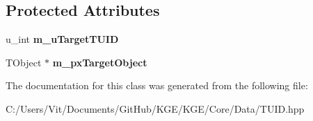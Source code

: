 \subsection*{Protected Attributes}
\begin{DoxyCompactItemize}
\item 
\hypertarget{class_k_g_e_1_1_t_u_i_d_1_1_cached_reference_a4497f5facd874ed1ff1f9c115fc605df}{u\-\_\-int {\bfseries m\-\_\-u\-Target\-T\-U\-I\-D}}\label{class_k_g_e_1_1_t_u_i_d_1_1_cached_reference_a4497f5facd874ed1ff1f9c115fc605df}

\item 
\hypertarget{class_k_g_e_1_1_t_u_i_d_1_1_cached_reference_a71adfa89d5b57a23bef5eba267e245db}{T\-Object $\ast$ {\bfseries m\-\_\-px\-Target\-Object}}\label{class_k_g_e_1_1_t_u_i_d_1_1_cached_reference_a71adfa89d5b57a23bef5eba267e245db}

\end{DoxyCompactItemize}


The documentation for this class was generated from the following file\-:\begin{DoxyCompactItemize}
\item 
C\-:/\-Users/\-Vit/\-Documents/\-Git\-Hub/\-K\-G\-E/\-K\-G\-E/\-Core/\-Data/T\-U\-I\-D.\-hpp\end{DoxyCompactItemize}
